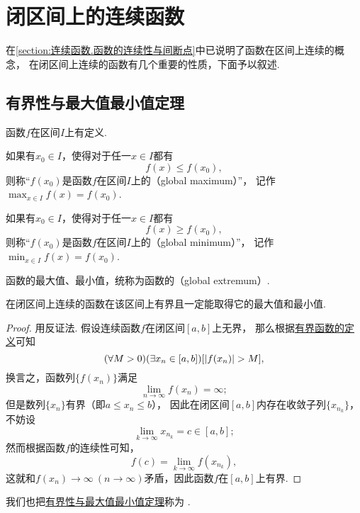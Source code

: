 \section{闭区间上的连续函数}
在\cref{section:连续函数.函数的连续性与间断点}中已说明了函数在区间上连续的概念，
在闭区间上连续的函数有几个重要的性质，下面予以叙述.

\subsection{有界性与最大值最小值定理}
\begin{definition}
函数\(f\)在区间\(I\)上有定义.

如果有\(x_0 \in I\)，使得对于任一\(x \in I\)都有\begin{equation*}
	f(x) \leq f(x_0),
\end{equation*}
则称“\(f(x_0)\)是函数\(f\)在区间\(I\)上的（global maximum）”，
记作\(\max_{x \in I} f(x) = f(x_0)\).

如果有\(x_0 \in I\)，使得对于任一\(x \in I\)都有\begin{equation*}
	f(x) \geq f(x_0),
\end{equation*}
则称“\(f(x_0)\)是函数\(f\)在区间\(I\)上的（global minimum）”，
记作\(\min_{x \in I} f(x) = f(x_0)\).
\end{definition}
函数的最大值、最小值，统称为函数的（global extremum）.

\begin{theorem}[有界性与最大值最小值定理]\label{theorem:极限.最值定理}
在闭区间上连续的函数在该区间上有界且一定能取得它的最大值和最小值.
\begin{proof}
用反证法.
假设连续函数\(f\)在闭区间\([a,b]\)上无界，
那么根据\hyperref[definition:函数.函数的有界性]{有界函数的定义}可知\begin{equation*}
	(\forall M>0)
	(\exists x_n\in[a,b])
	[\abs{f(x_n)} > M],
\end{equation*}
换言之，函数列\(\{f(x_n)\}\)满足\begin{equation*}
	\lim_{n\to\infty} f(x_n) = \infty;
\end{equation*}
但是数列\(\{x_n\}\)有界（即\(a \leq x_n \leq b\)），
因此在闭区间\([a,b]\)内存在收敛子列\(\{x_{n_k}\}\)，
不妨设\begin{equation*}
	\lim_{k\to\infty} x_{n_k} = c \in [a,b];
\end{equation*}
然而根据函数\(f\)的连续性可知，\begin{equation*}
	f(c) = \lim_{k\to\infty} f(x_{n_k}),
\end{equation*}
这就和\(f(x_n)\to\infty\ (n\to\infty)\)矛盾，因此函数\(f\)在\([a,b]\)上有界.
\end{proof}
\end{theorem}
我们也把\hyperref[theorem:极限.最值定理]{有界性与最大值最小值定理}称为%
.

